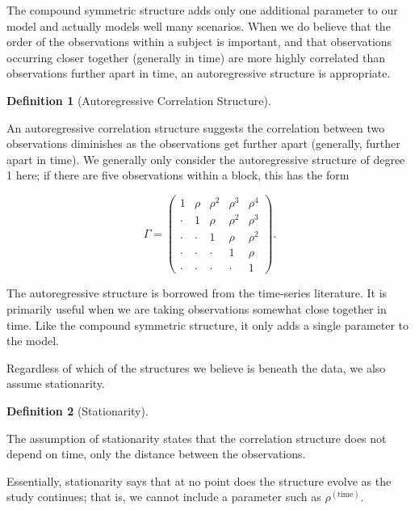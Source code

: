 \documentclass[
  letterpaper,
  DIV=11,
  numbers=noendperiod]{scrreprt}
\theoremstyle{definition}
\theoremstyle{definition}
\newtheorem{definition}{Definition}[chapter]
\theoremstyle{remark}
\begin{document}
The compound symmetric structure adds only one additional parameter to
our model and actually models well many scenarios. When we do believe
that the order of the observations within a subject is important, and
that observations occurring closer together (generally in time) are more
highly correlated than observations further apart in time, an
autoregressive structure is appropriate.

\begin{definition}[Autoregressive Correlation
Structure]\protect\hypertarget{def-autoregressive-correlation-structure}{}\label{def-autoregressive-correlation-structure}

An autoregressive correlation structure suggests the correlation between
two observations diminishes as the observations get further apart
(generally, further apart in time). We generally only consider the
autoregressive structure of degree 1 here; if there are five
observations within a block, this has the form

\[\Gamma = \begin{pmatrix} 
1 & \rho & \rho^2 & \rho^3 & \rho^4 \\
\cdot & 1 & \rho & \rho^2 & \rho^3 \\
\cdot & \cdot & 1 & \rho & \rho^2 \\
\cdot & \cdot & \cdot & 1 & \rho \\
\cdot & \cdot & \cdot & \cdot & 1 \end{pmatrix}.\]

\end{definition}

The autoregressive structure is borrowed from the time-series
literature. It is primarily useful when we are taking observations
somewhat close together in time. Like the compound symmetric structure,
it only adds a single parameter to the model.

Regardless of which of the structures we believe is beneath the data, we
also assume stationarity.

\begin{definition}[Stationarity]\protect\hypertarget{def-stationarity}{}\label{def-stationarity}

The assumption of stationarity states that the correlation structure
does not depend on time, only the distance between the observations.

\end{definition}

Essentially, stationarity says that at no point does the structure
evolve as the study continues; that is, we cannot include a parameter
such as \(\rho^{(\text{time})}\).
\end{document}

